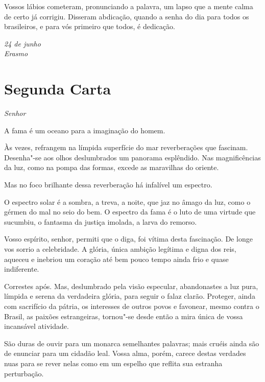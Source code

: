 Vossos lábios cometeram, pronunciando a palavra, um lapso que a mente
calma de certo já corrigiu. Disseram abdicação, quando a senha do dia
para todos os brasileiros, e para vós primeiro que todos, é dedicação.

\begin{flushright}\EP[1]
\textit{24 de junho\\
Erasmo}
\end{flushright}

\chapter[Segunda carta]{Segunda Carta}

\vspace*{-1ex}

\noindent\textit{Senhor}\smallskip

A fama é um oceano para a imaginação do homem.  

Às vezes, refrangem na límpida superfície do mar reverberações que
fascinam. Desenha"-se aos olhos deslumbrados um panorama esplêndido.
Nas magnificências da luz, como na pompa das formas, excede as
maravilhas do oriente. 

Mas no foco brilhante dessa reverberação há infalível um espectro.

O espectro solar é a sombra, a treva, a noite, que jaz no âmago da luz,
como o gérmen do mal no seio do bem. O espectro da fama é o luto de uma
virtude que sucumbiu, o fantasma da justiça imolada, a larva do remorso. 

Vosso espírito, senhor, permiti que o diga, foi vítima desta fascinação.
De longe vos sorrio a celebridade. A glória, única ambição legítima e
digna dos reis, aqueceu e inebriou um coração até bem pouco tempo
ainda frio e quase indiferente. 

Correstes após. Mas, deslumbrado pela visão especular, abandonastes a
luz pura, límpida e serena da verdadeira glória, para seguir o falaz
clarão. Proteger, ainda com sacrifício da pátria, os interesses de
outros povos e favonear, mesmo contra o Brasil, as paixões
estrangeiras, tornou"-se desde então a mira única de vossa incansável atividade. \label{incansavel}

São duras de ouvir para um monarca semelhantes palavras; mais cruéis
ainda são de enunciar para um cidadão leal. Vossa alma, porém, carece
destas verdades nuas para se rever nelas como em um espelho que reflita
sua estranha perturbação.

